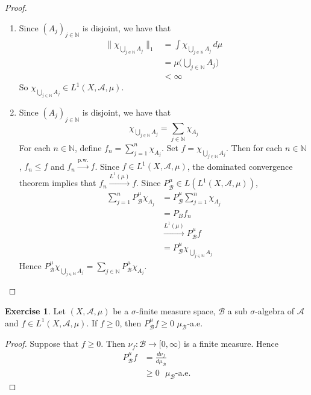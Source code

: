 \documentclass{book}
\theoremstyle{definition}
\newtheorem{ex}[definition]{Exercise}
\newcommand{\sig}{\sigma}
\newcommand{\N}{\mathbb{N}}
\newcommand{\MA}{\mathcal{A}}
\newcommand{\MB}{\mathcal{B}}
\DeclareMathOperator*{\0}{\mbf{0}}
\DeclareMathOperator*{\1}{\mbf{1}}
\newcommand{\convt}[1]{\xrightarrow{\text{#1}}}
\newcommand{\conv}[1]{\xrightarrow{#1}}
\newcommand{\dmu}{\, d \mu}
\begin{document}
	\begin{proof}\
		\begin{enumerate}
			\item Since $(A_j)_{j \in \N}$ is disjoint, we have that 
			\begin{align*}
				\|\chi_{\bigcup\limits_{j \in \N} A_j}\|_1 
				& = \int \chi_{\bigcup\limits_{j \in \N} A_j} \dmu \\
				& = \mu\bigg(\bigcup\limits_{j \in \N} A_j \bigg) \\
				& < \infty
			\end{align*}
			So $\chi_{\bigcup\limits_{j \in \N} A_j} \in L^1(X, \MA, \mu)$.
			\item Since  $(A_j)_{j \in \N}$ is disjoint, we have that 
			$$\chi_{\bigcup\limits_{j \in \N} A_j} = \sum\limits_{j \in \N} \chi_{A_j}$$
			For each $n \in \N$, define $f_n = \sum\limits_{j = 1}^n \chi_{A_j}$. Set $f = \chi_{\bigcup\limits_{j \in \N} A_j}$. Then for each $n \in \N$, $f_n \leq f$ and $f_n \convt{p.w.} f$. Since $f \in L^1(X, \MA, \mu)$, the dominated convergence theorem implies that $f_n \conv{L^1(\mu)} f$. Since $P^{\mu}_{\MB} \in L(L^1(X, \MA, \mu))$, 
			\begin{align*}
				\sum_{j=1}^n P^{\mu}_{\MB} \chi_{A_j}
				& = P^{\mu}_{\MB} \sum_{j=1}^n \chi_{A_j} \\
				& = P_{B}f_n \\
				& \conv{L^1(\mu)} P^{\mu}_{\MB}f \\
				& = P^{\mu}_{\MB} \chi_{\bigcup\limits_{j \in \N} A_j} 
			\end{align*}  
			Hence  $P^{\mu}_{\MB} \chi_{\bigcup\limits_{j \in \N} A_j} = \sum\limits_{j \in \N} P^{\mu}_{\MB}\chi_{A_j}$.
		\end{enumerate}
	\end{proof}

	\begin{ex}
		Let $(X, \MA, \mu)$ be a $\sig$-finite measure space, $\MB$ a sub $\sig$-algebra of $\MA$ and $f \in L^1(X, \MA, \mu)$. If $f \geq 0$, then $P^{\mu}_{\MB}f \geq 0$ $\mu_{\MB}$-a.e.
	\end{ex}

	\begin{proof}
		Suppose that $f \geq 0$. Then $\nu_f: \MB \rightarrow [0, \infty)$ is a finite measure. Hence 
		\begin{align*}
			P^{\mu}_{\MB}f 
			& = \frac{d \nu_f}{d \mu_{\MB}} \\
			& \geq 0 \text{ $\mu_{\MB}$-a.e.}
		\end{align*}
	\end{proof}
\end{document}
